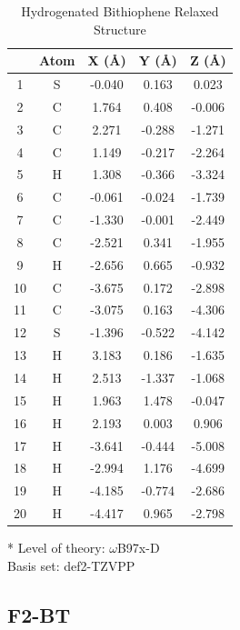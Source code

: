 \begin{table}[hbt!]\centering
\caption{Hydrogenated Bithiophene Relaxed Structure}
\renewcommand{\arraystretch}{1.5}
\begin{threeparttable}
\begin{tabular}{ccccc}\toprule
{} & {Atom} & {X (\AA)} & {Y (\AA)} & {Z (\AA)} \\ \midrule
    1 & S & -0.040 & 0.163 & 0.023\\
    2 & C & 1.764 & 0.408 & -0.006\\
    3 & C & 2.271 & -0.288 & -1.271\\
    4 & C & 1.149 & -0.217 & -2.264\\
    5 & H & 1.308 & -0.366 & -3.324\\
    6 & C & -0.061 & -0.024 & -1.739\\
    7 & C & -1.330 & -0.001 & -2.449\\
    8 & C & -2.521 & 0.341 & -1.955\\
    9 & H & -2.656 & 0.665 & -0.932\\
    10 & C & -3.675 & 0.172 & -2.898\\
    11 & C & -3.075 & 0.163 & -4.306\\
    12 & S & -1.396 & -0.522 & -4.142\\
    13 & H & 3.183 & 0.186 & -1.635\\
    14 & H & 2.513 & -1.337 & -1.068\\
    15 & H & 1.963 & 1.478 & -0.047\\
    16 & H & 2.193 & 0.003 & 0.906\\
    17 & H & -3.641 & -0.444 & -5.008\\
    18 & H & -2.994 & 1.176 & -4.699\\
    19 & H & -4.185 & -0.774 & -2.686\\
    20 & H & -4.417 & 0.965 & -2.798\\
 \bottomrule
\end{tabular}
\begin{tablenotes}
\item[*] \footnotesize Level of theory: $\omega$B97x-D \\ Basis set: def2-TZVPP
\end{tablenotes}
\end{threeparttable}
\end{table}

\clearpage
\subsection{F2-BT}


